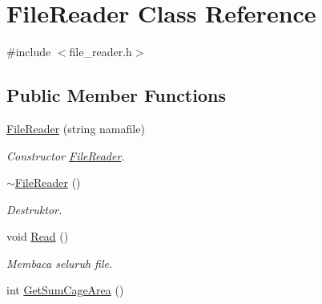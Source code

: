 \hypertarget{classFileReader}{\section{File\-Reader Class Reference}
\label{classFileReader}
}


{\ttfamily \#include $<$file\-\_\-reader.\-h$>$}

\subsection*{Public Member Functions}
\begin{DoxyCompactItemize}
\item 
\hyperlink{classFileReader_a241d583987200240c86d267b80ef3f0a}{File\-Reader} (string namafile)
\begin{DoxyCompactList}\small\item\em Constructor \hyperlink{classFileReader}{File\-Reader}. \end{DoxyCompactList}\item 
\hypertarget{classFileReader_a1382969e8f1468f3b04ad4b44ab39dee}{\hyperlink{classFileReader_a1382969e8f1468f3b04ad4b44ab39dee}{$\sim$\-File\-Reader} ()}\label{classFileReader_a1382969e8f1468f3b04ad4b44ab39dee}

\begin{DoxyCompactList}\small\item\em Destruktor. \end{DoxyCompactList}\item 
\hypertarget{classFileReader_ac4a834d4f54c0ef1ce9a992f510eea41}{void \hyperlink{classFileReader_ac4a834d4f54c0ef1ce9a992f510eea41}{Read} ()}\label{classFileReader_ac4a834d4f54c0ef1ce9a992f510eea41}

\begin{DoxyCompactList}\small\item\em Membaca seluruh file. \end{DoxyCompactList}\item 
\hypertarget{classFileReader_a7d5f714729c507013c9a15ff300b9c26}{int \hyperlink{classFileReader_a7d5f714729c507013c9a15ff300b9c26}{Get\-Sum\-Cage\-Area} ()}\label{classFileReader_a7d5f714729c507013c9a15ff300b9c26}


\end{DoxyCompactItemize}
